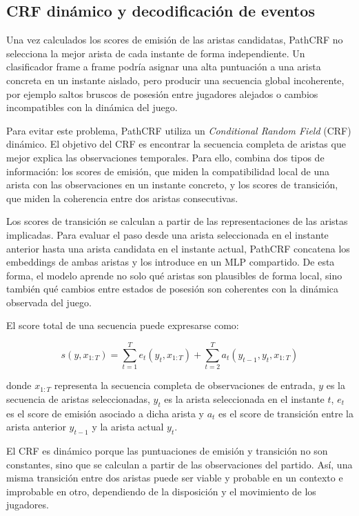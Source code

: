\subsection{CRF dinámico y decodificación de eventos}
\label{subsec:crf-dinamico}

Una vez calculados los scores de emisión de las aristas candidatas, PathCRF no selecciona la mejor arista de cada instante de forma independiente. Un clasificador frame a frame podría asignar una alta puntuación a una arista concreta en un instante aislado, pero producir una secuencia global incoherente, por ejemplo saltos bruscos de posesión entre jugadores alejados o cambios incompatibles con la dinámica del juego.

Para evitar este problema, PathCRF utiliza un \textit{Conditional Random Field} (CRF) dinámico. El objetivo del CRF es encontrar la secuencia completa de aristas que mejor explica las observaciones temporales. Para ello, combina dos tipos de información: los scores de emisión, que miden la compatibilidad local de una arista con las observaciones en un instante concreto, y los scores de transición, que miden la coherencia entre dos aristas consecutivas.

Los scores de transición se calculan a partir de las representaciones de las aristas implicadas. Para evaluar el paso desde una arista seleccionada en el instante anterior hasta una arista candidata en el instante actual, PathCRF concatena los embeddings de ambas aristas y los introduce en un MLP compartido. De esta forma, el modelo aprende no solo qué aristas son plausibles de forma local, sino también qué cambios entre estados de posesión son coherentes con la dinámica observada del juego.

El score total de una secuencia puede expresarse como:

\[
s(y,x_{1:T}) =
\sum_{t=1}^{T} e_t(y_t,x_{1:T}) +
\sum_{t=2}^{T} a_t(y_{t-1},y_t,x_{1:T})
\]

donde $x_{1:T}$ representa la secuencia completa de observaciones de entrada, $y$ es la secuencia de aristas seleccionadas, $y_t$ es la arista seleccionada en el instante $t$, $e_t$ es el score de emisión asociado a dicha arista y $a_t$ es el score de transición entre la arista anterior $y_{t-1}$ y la arista actual $y_t$.

El CRF es dinámico porque las puntuaciones de emisión y transición no son constantes, sino que se calculan a partir de las observaciones del partido. Así, una misma transición entre dos aristas puede ser viable y probable en un contexto e improbable en otro, dependiendo de la disposición y el movimiento de los jugadores.

